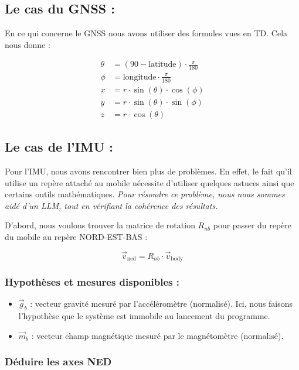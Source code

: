 \subsection*{Le cas du GNSS :}

En ce qui concerne le GNSS nous avons utiliser des formules vues en TD. Cela nous donne :

\begin{align*}
\theta &= (90 - \text{latitude}) \cdot \frac{\pi}{180} \\
\phi &= \text{longitude} \cdot \frac{\pi}{180} \\
x &= r \cdot \sin(\theta) \cdot \cos(\phi) \\
y &= r \cdot \sin(\theta) \cdot \sin(\phi) \\
z &= r \cdot \cos(\theta)
\end{align*}


\subsection*{Le cas de l'IMU :}

Pour l'IMU, nous avons rencontrer bien plus de problèmes. En effet, le fait qu'il utilise un repère attaché au mobile nécessite d'utiliser quelques astuces ainsi que certains outils mathématiques. {\small \textit{Pour résoudre ce problème, nous nous sommes aidé d'un LLM, tout en vérifiant la cohérence des résultats.}}

D'abord, nous voulons trouver la matrice de rotation \( R_{nb} \) pour passer du repère du mobile au repère NORD-EST-BAS :

\[ \vec{v}_{\text{ned}} = R_{nb} \cdot \vec{v}_{\text{body}} \]

\subsubsection*{Hypothèses et mesures disponibles :}

\begin{itemize}
    \item \(\vec{g}_b\) : vecteur gravité mesuré par l'accéléromètre (normalisé). Ici, nous faisons l'hypothèse que le système est immobile au lancement du programme.
    \item \(\vec{m}_b\) : vecteur champ magnétique mesuré par le magnétomètre (normalisé).
\end{itemize}

\subsubsection*{Déduire les axes NED}


